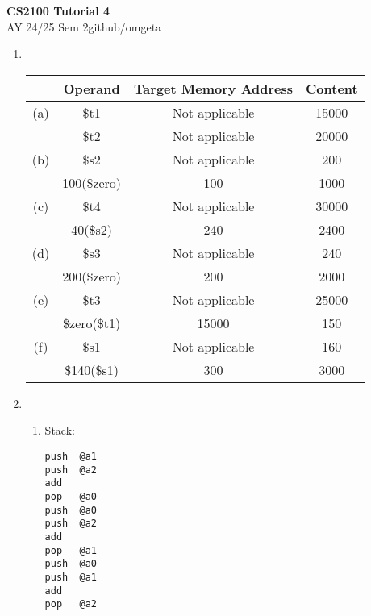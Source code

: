 \documentclass[12pt, a4paper]{article}
\newcommand{\mytitle}{CS2100 Tutorial 4}
\newcommand{\myauthor}{github/omgeta}
\newcommand{\mydate}{AY 24/25 Sem 2}
\begin{document}
\raggedright
\footnotesize
\begin{center}
{\normalsize{\textbf{\mytitle}}} \\
{\footnotesize{\mydate\hspace{2pt}\textemdash\hspace{2pt}\myauthor}}
\end{center}
\begin{enumerate}[Q\arabic*.]
  \item \hspace{1em}\\
    \begin{tabular}{|c|c|c|c|}
      \hline
          & Operand & Target Memory Address & Content \\
      \hline
      (a) & \$t1 & Not applicable & 15000 \\
          & \$t2 & Not applicable & 20000 \\
      \hline
      (b) & \$s2 & Not applicable & 200 \\
          & 100(\$zero) & 100 & 1000 \\
      \hline
      (c) & \$t4 & Not applicable & 30000 \\
          & 40(\$s2) & 240 & 2400 \\
      \hline
      (d) & \$s3 & Not applicable & 240 \\
          & 200(\$zero) & 200 & 2000 \\
      \hline
      (e) & \$t3 & Not applicable & 25000 \\
          & \$zero(\$t1) & 15000 & 150 \\
      \hline
      (f) & \$s1 & Not applicable & 160 \\
          & \$140(\$s1) & 300 & 3000 \\
      \hline
      \end{tabular}
\pagebreak
  \item 
    \begin{enumerate}[(\alph*.)]
      \item Stack:
        \begin{lstlisting}
push  @a1
push  @a2
add
pop   @a0 
push  @a0
push  @a2
add 
pop   @a1
push  @a0
push  @a1
add 
pop   @a2

        \end{lstlisting}


\end{enumerate}
\end{enumerate}
\end{document}
